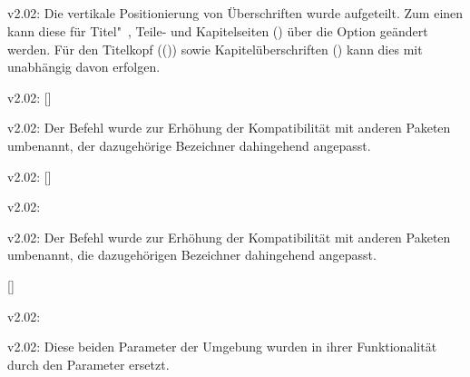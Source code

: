 \subsection{}
\begin{Obsolete}{v2.02:}{}
\printobsoletelist%
%
Die vertikale Positionierung von Überschriften wurde aufgeteilt. Zum einen kann 
diese für Titel"~, Teile- und Kapitelseiten () über 
die Option  geändert werden. Für den Titelkopf
(()) sowie Kapitelüberschriften 
() kann dies mit  unabhängig 
davon erfolgen.
\end{Obsolete}

\begin{Obsolete}{v2.02:}{%
  []%
}
\begin{Obsolete}{v2.02:}{}
\printobsoletelist%
%
Der Befehl wurde zur Erhöhung der Kompatibilität mit anderen Paketen umbenannt, 
der dazugehörige Bezeichner dahingehend angepasst.
\end{Obsolete}
\end{Obsolete}

\begin{Obsolete}{v2.02:}{%
  []%
}
\begin{Obsolete}{v2.02:}{}
\begin{Obsolete}{v2.02:}{}
\printobsoletelist%
%
Der Befehl wurde zur Erhöhung der Kompatibilität mit anderen Paketen umbenannt, 
die dazugehörigen Bezeichner dahingehend angepasst.
\end{Obsolete}
\end{Obsolete}
\end{Obsolete}

\begin{Obsolete}{}{[]}
\begin{Obsolete}{v2.02:}{%
}
\begin{Obsolete}{v2.02:}{%
}
\printobsoletelist%
%
Diese beiden Parameter der Umgebung  wurden in ihrer 
Funktionalität durch den Parameter  
ersetzt.
\end{Obsolete}
\end{Obsolete}
\end{Obsolete}



